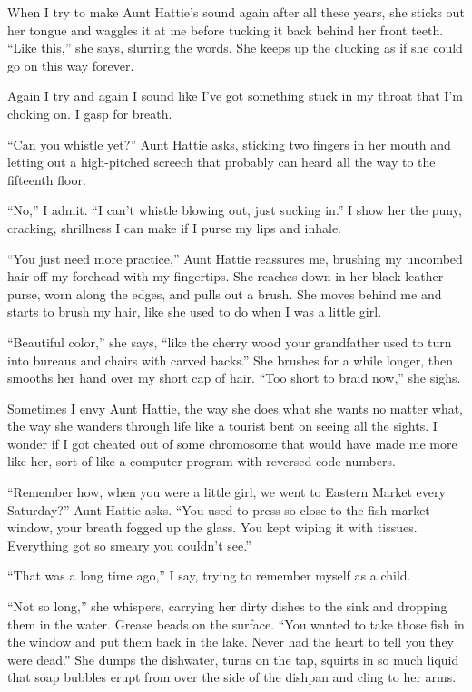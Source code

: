 \documentclass[twoside,10pt]{book}
\begin{document}
When I try to make Aunt Hattie's sound again after all these years, she
sticks out her tongue and waggles it at me before tucking it back behind
her front teeth. ``Like this,'' she says, slurring the words. She keeps
up the clucking as if she could go on this way forever.

Again I try and again I sound like I've got something stuck in my throat
that I'm choking on. I gasp for breath.

``Can you whistle yet?'' Aunt Hattie asks, sticking two fingers in her
mouth and letting out a high-pitched screech that probably can heard all
the way to the fifteenth floor.

``No,'' I admit. ``I can't whistle blowing out, just sucking in.'' I
show her the puny, cracking, shrillness I can make if I purse my lips
and inhale.

``You just need more practice,'' Aunt Hattie reassures me, brushing my
uncombed hair off my forehead with my fingertips. She reaches down in
her black leather purse, worn along the edges, and pulls out a brush.
She moves behind me and starts to brush my hair, like she used to do
when I was a little girl.

``Beautiful color,'' she says, ``like the cherry wood your grandfather
used to turn into bureaus and chairs with carved backs.'' She brushes
for a while longer, then smooths her hand over my short cap of hair.
``Too short to braid now,'' she sighs.

Sometimes I envy Aunt Hattie, the way she does what she wants no matter
what, the way she wanders through life like a tourist bent on seeing all
the sights. I wonder if I got cheated out of some chromosome that would
have made me more like her, sort of like a computer program with
reversed code numbers.

``Remember how, when you were a little girl, we went to Eastern Market
every Saturday?'' Aunt Hattie asks. ``You used to press so close to the
fish market window, your breath fogged up the glass. You kept wiping it
with tissues. Everything got so smeary you couldn't see.''

``That was a long time ago,'' I say, trying to remember myself as a
child.

``Not so long,'' she whispers, carrying her dirty dishes to the sink and
dropping them in the water. Grease beads on the surface. ``You wanted to
take those fish in the window and put them back in the lake. Never had
the heart to tell you they were dead.'' She dumps the dishwater, turns
on the tap, squirts in so much liquid that soap bubbles erupt from over
the side of the dishpan and cling to her arms.
\end{document}
